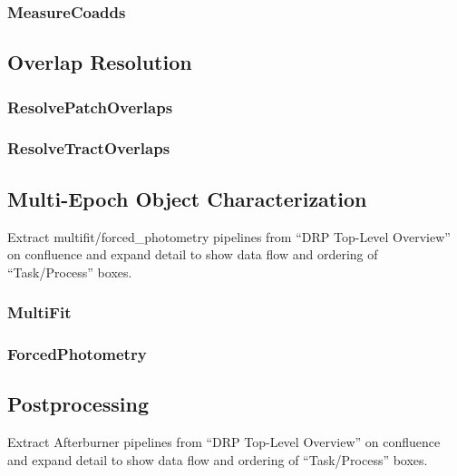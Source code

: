 \subsubsection{MeasureCoadds}
\label{sec:drpMeasureCoadds}

\subsection{Overlap Resolution}
\label{sec:drp_overlap_resolution}

\subsubsection{ResolvePatchOverlaps}
\label{sec:drpResolvePatchOverlaps}
\subsubsection{ResolveTractOverlaps}
\label{sec:drpResolveTractOverlaps}

\subsection{Multi-Epoch Object Characterization}
\label{sec:drp_multi_epoch_object_characterization}

\begin{note}
Extract multifit/forced\_photometry pipelines from ``DRP Top-Level Overview'' on confluence and expand detail to show data flow and ordering of ``Task/Process'' boxes.
\end{note}

\subsubsection{MultiFit}
\label{sec:drpMultiFit}

\subsubsection{ForcedPhotometry}
\label{sec:drpForcedPhotometry}

\subsection{Postprocessing}
\label{sec:drp_postprocessing}

\begin{note}
Extract Afterburner pipelines from ``DRP Top-Level Overview'' on confluence and expand detail to show data flow and ordering of ``Task/Process'' boxes.
\end{note}

